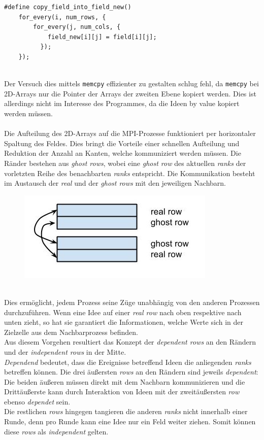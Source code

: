 \begin{verbatim}
#define copy_field_into_field_new()        
    for_every(i, num_rows, {               
        for_every(j, num_cols, {           
            field_new[i][j] = field[i][j]; 
          });                              
    });
\end{verbatim}
\quad \\
Der Versuch dies mittels \texttt{memcpy} effizienter zu gestalten schlug fehl, da \texttt{memcpy} bei 2D-Arrays nur die Pointer der Arrays der zweiten Ebene kopiert werden. 
Dies ist allerdings nicht im Interesse des Programmes, da die Ideen by value kopiert werden müssen. \\
\newpage
\quad \\
Die Aufteilung des 2D-Arrays auf die MPI-Prozesse funktioniert per horizontaler Spaltung des Feldes.
Dies bringt die Vorteile einer schnellen Aufteilung und Reduktion der Anzahl an Kanten, welche kommuniziert werden müssen.
Die Ränder bestehen aus \textit{ghost rows}, wobei eine \textit{ghost row} des aktuellen \textit{ranks} der vorletzten Reihe des benachbarten \textit{ranks} entspricht. Die Kommunikation besteht im Austausch der \textit{real} und der \textit{ghost rows} mit den jeweiligen Nachbarn.

\begin{figure}[htbp]
\centering
\includegraphics[scale=1]{pics/real-ghost-rows.jpg}
\end{figure}
\quad \\
Dies ermöglicht, jedem Prozess seine Züge unabhängig von den anderen Prozessen durchzuführen. 
Wenn eine Idee auf einer \textit{real row} nach oben respektive nach unten zieht, so hat sie garantiert die Informationen, welche Werte sich in der Zielzelle aus dem Nachbarprozess befinden. \\
Aus diesem Vorgehen resultiert das Konzept der \textit{dependent rows} an den Rändern und der \textit{independent rows} in der Mitte. \\
\textit{Dependend} bedeutet, dass die Ereignisse betreffend Ideen die anliegenden \textit{ranks} betreffen können. 
Die drei äußersten \textit{rows} an den Rändern sind jeweils \textit{dependent}: 
Die beiden äußeren müssen direkt mit dem Nachbarn kommunizieren und die Drittäußerste kann durch Interaktion von Ideen mit der zweitäußersten \textit{row} ebenso \textit{dependet} sein.  \\
Die restlichen \textit{rows} hingegen tangieren die anderen \textit{ranks} nicht innerhalb einer Runde, denn pro Runde kann eine Idee nur ein Feld weiter ziehen. 
Somit können diese \textit{rows} als \textit{independent} gelten.
\newpage

